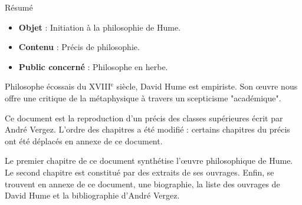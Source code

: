 \begin{center}
\Large
Résumé
\normalsize
\end{center}
\vspace{3cm}
\begin{itemize}[leftmargin=1cm, label=, itemsep=21pt]
\item {\bf Objet} : Initiation à la philosophie de Hume.
\item {\bf Contenu} : Précis de philosophie.
\item {\bf Public concerné} : Philosophe en herbe.
\end{itemize}

\vspace{3cm}

Philosophe écossais du {\footnotesize XVIII}$^{\text{e}}$ siècle, David Hume est empiriste. Son œuvre nous offre une critique de la métaphysique à travers un scepticisme "académique".

\vspace{3cm}

Ce document est la reproduction d'un précis des classes supérieures écrit par André Vergez. L'ordre des chapitres a été modifié : certains chapitres du précis ont été déplacés en annexe de ce document.

\vspace{3cm}

Le premier chapitre de ce document synthétise l'œuvre philosophique de Hume. Le second chapitre est constitué par des  extraits de ses ouvrages. Enfin, se trouvent en annexe de ce document, une biographie, la liste des ouvrages de David Hume et la bibliographie d'André Vergez.

